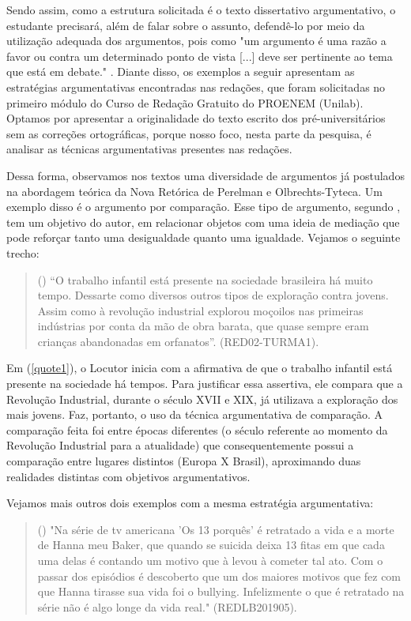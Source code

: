 \documentclass{textolivre}
\newcounter{quote}
\newenvironment{myquote}%
{%
\refstepcounter{quote}%
\begin{quote}(\thequote)%
}%
{\end{quote}}%
\begin{document}
Sendo assim, como a estrutura solicitada é o texto dissertativo argumentativo, o estudante precisará, além de falar sobre o assunto, defendê-lo por meio da utilização adequada dos argumentos, pois como "um argumento é uma razão a favor ou contra um determinado ponto de vista [...] deve ser pertinente ao tema que está em debate." \cite[p. 176]{fiorin2018}. Diante disso, os exemplos a seguir apresentam as estratégias argumentativas encontradas nas redações, que foram solicitadas no primeiro módulo do Curso de Redação Gratuito do PROENEM (Unilab). Optamos por apresentar a originalidade do texto escrito dos pré-universitários sem as correções ortográficas, porque nosso foco, nesta parte da pesquisa, é analisar as técnicas argumentativas presentes nas redações.

Dessa forma, observamos nos textos uma diversidade de argumentos já postulados na abordagem teórica da Nova Retórica de Perelman e Olbrechts-Tyteca. Um exemplo disso é o argumento por comparação. Esse tipo de argumento, segundo \textcite[p. 291]{perelman1996}, tem um objetivo do autor, em relacionar objetos com uma ideia de mediação que pode reforçar tanto uma desigualdade quanto uma igualdade. Vejamos o seguinte trecho:

\begin{myquote}\label{quote1}
“O trabalho infantil está presente na sociedade brasileira há muito tempo. Dessarte como diversos outros tipos de exploração contra jovens. Assim como à revolução industrial explorou moçoilos nas primeiras indústrias por conta da mão de obra barata, que quase sempre eram crianças abandonadas em orfanatos”. (RED02-TURMA1).
\end{myquote}

Em (\ref{quote1}), o Locutor inicia com a afirmativa de que o trabalho infantil está presente na sociedade há tempos. Para justificar essa assertiva, ele compara que a Revolução Industrial, durante o século XVII e XIX, já utilizava a exploração dos mais jovens. Faz, portanto, o uso da técnica argumentativa de comparação. A comparação feita foi entre épocas diferentes (o século referente ao momento da Revolução Industrial para a atualidade) que consequentemente possui a comparação entre lugares distintos (Europa X Brasil), aproximando duas realidades distintas com objetivos argumentativos. 

Vejamos mais outros dois exemplos com a mesma estratégia argumentativa:

\begin{myquote}\label{quote2}
"Na série de tv americana 'Os 13 porquês' é retratado a vida e a morte de Hanna meu Baker, que quando se suicida deixa 13 fitas em que cada uma delas é contando um motivo que à levou à cometer tal ato. Com o passar dos episódios é descoberto que um dos maiores motivos que fez com que Hanna tirasse sua vida foi o bullying. Infelizmente o que é retratado na série não é algo longe da vida real." (REDLB201905).
\end{myquote}
\end{document}

